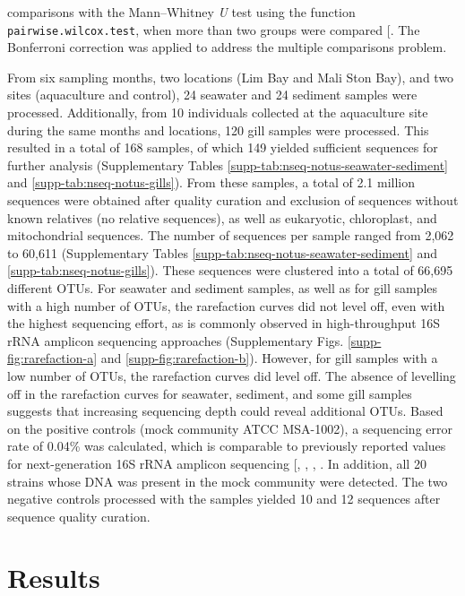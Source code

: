 \documentclass[
  12 pt,
]{article}
\begin{document}
comparisons with the Mann--Whitney \emph{U} test using the function \texttt{pairwise.wilcox.test}, when more than two groups were compared {[}\citeproc{ref-R-base}{61}{]}. The Bonferroni correction was applied to address the multiple comparisons problem.

From six sampling months, two locations (Lim Bay and Mali Ston Bay), and two sites (aquaculture and control), 24 seawater and 24 sediment samples were processed. Additionally, from 10 individuals collected at the aquaculture site during the same months and locations, 120 gill samples were processed. This resulted in a total of 168 samples, of which 149 yielded sufficient sequences for further analysis (Supplementary Tables \ref{supp-tab:nseq-notus-seawater-sediment} and \ref{supp-tab:nseq-notus-gills}). From these samples, a total of 2.1 million sequences were obtained after quality curation and exclusion of sequences without known relatives (no relative sequences), as well as eukaryotic, chloroplast, and mitochondrial sequences. The number of sequences per sample ranged from 2,062 to 60,611 (Supplementary Tables \ref{supp-tab:nseq-notus-seawater-sediment} and \ref{supp-tab:nseq-notus-gills}). These sequences were clustered into a total of 66,695 different OTUs. For seawater and sediment samples, as well as for gill samples with a high number of OTUs, the rarefaction curves did not level off, even with the highest sequencing effort, as is commonly observed in high-throughput 16S rRNA amplicon sequencing approaches (Supplementary Figs. \ref{supp-fig:rarefaction-a} and \ref{supp-fig:rarefaction-b}). However, for gill samples with a low number of OTUs, the rarefaction curves did level off. The absence of levelling off in the rarefaction curves for seawater, sediment, and some gill samples suggests that increasing sequencing depth could reveal additional OTUs. Based on the positive controls (mock community ATCC MSA-1002), a sequencing error rate of 0.04\unit{\percent} was calculated, which is comparable to previously reported values for next-generation 16S rRNA amplicon sequencing {[}, , , \citeproc{ref-Schloss2016}{95}{]}. In addition, all 20 strains whose DNA was present in the mock community were detected. The two negative controls processed with the samples yielded 10 and 12 sequences after sequence quality curation.
\newpage

\section{Results}\label{results}
\end{document}
